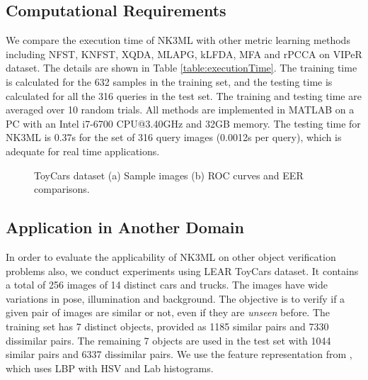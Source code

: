 \documentclass[runningheads]{llncs}
\begin{document}
\subsection{Computational Requirements}

We compare the execution time of 
NK3ML with other metric learning methods including NFST\cite{Zheng:nfst}, KNFST\cite{Zheng:nfst}, XQDA\cite{LOMO,GOG},  MLAPG\cite{MLAPG}, kLFDA\cite{rPcca}, MFA\cite{rPcca} and rPCCA\cite{rPcca}  on VIPeR dataset. The details are shown in Table \ref{table:executionTime}. The training time is calculated for the 632 samples in the training set, and the testing time is calculated for all the 316 queries in the test set. The training and testing time are averaged over 10 random trials. All methods are implemented in MATLAB
on a PC with an Intel i7-6700 CPU@3.40GHz and 32GB memory. The testing time for NK3ML is 0.37s for the set of 316 query images (0.0012s per query), which is adequate for real time applications. 


\begin{figure}[h] 
\begin{center}
 \qquad
  \end{center}
  \caption{ToyCars dataset (a) Sample images (b) ROC curves and EER comparisons.} 
  \label{fig:ToyCar}
\end{figure}

\subsection{ Application in Another Domain}
In order to evaluate the applicability of NK3ML on other object verification problems also, we conduct experiments using LEAR ToyCars \cite{ToyCarDataset} dataset. It contains a total of 256 images of 14 distinct cars and trucks. The images have wide variations in pose, illumination and background. The objective is to verify if a given pair of images are similar or not, even if they are \textit{unseen} before. The training set has 7 distinct objects, provided as 1185 similar pairs and 7330 dissimilar pairs. The remaining 7 objects are used in the test set with 1044 similar pairs and 6337 dissimilar pairs. We use  the feature representation from \cite{KISSME}, which uses LBP with HSV and Lab histograms. 
\end{document}
